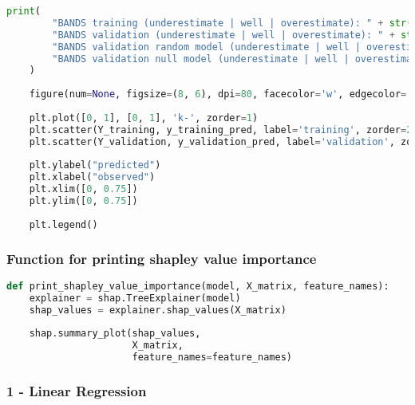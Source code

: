 \begin{lstlisting}[language=Python]
    print(
        "BANDS training (underestimate | well | overestimate): " + str(underestimate_training_rate) + " | " + str(wellestimate_training_rate) + " | " + str(overestimate_training_rate) + "\n" + 
        "BANDS validation (underestimate | well | overestimate): " + str(underestimate_validation_rate) + " | " + str(wellestimate_validation_rate) + " | " + str(overestimate_validation_rate) + "\n" + 
        "BANDS validation random model (underestimate | well | overestimate): " + str(underestimate_random_rate) + " | " + str(wellestimate_random_rate) + " | " + str(overestimate_random_rate) + "\n" + 
        "BANDS validation null model (underestimate | well | overestimate): " + str(underestimate_null_rate) + " | " + str(wellestimate_null_rate) + " | " + str(overestimate_null_rate)
    )
    
    figure(num=None, figsize=(8, 6), dpi=80, facecolor='w', edgecolor='k')
    
    plt.plot([0, 1], [0, 1], 'k-', zorder=1)
    plt.scatter(Y_training, y_training_pred, label='training', zorder=2)
    plt.scatter(Y_validation, y_validation_pred, label='validation', zorder=3)
    
    plt.ylabel("predicted")
    plt.xlabel("observed")
    plt.xlim([0, 0.75])
    plt.ylim([0, 0.75])
    
    plt.legend()
\end{lstlisting}

\hypertarget{function-for-printing-shapley-value-importance}{%
\subsubsection{Function for printing shapley value
importance}\label{function-for-printing-shapley-value-importance}}

\begin{lstlisting}[language=Python]
def print_shapley_value_importance(model, X_matrix, feature_names):
    explainer = shap.TreeExplainer(model)
    shap_values = explainer.shap_values(X_matrix)
    
    shap.summary_plot(shap_values,
                      X_matrix,
                      feature_names=feature_names)
\end{lstlisting}

\hypertarget{linear-regression}{%
\subsubsection{1 - Linear Regression}\label{linear-regression}}

